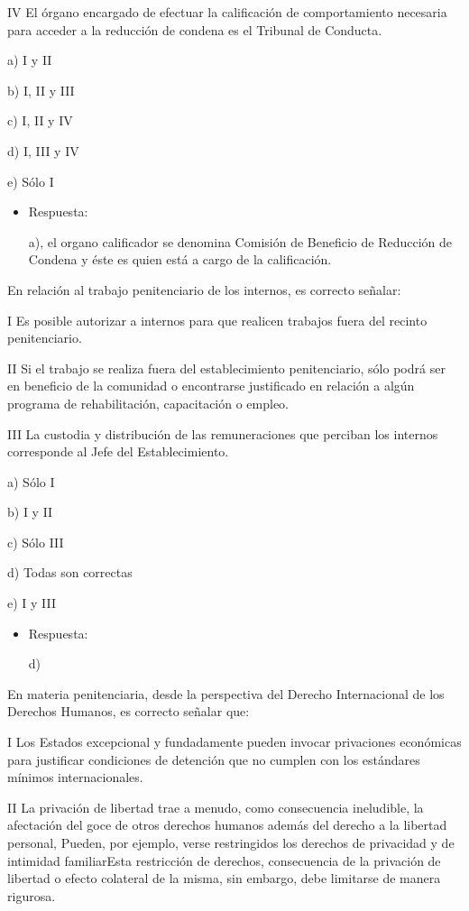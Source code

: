 \documentclass[letterpaper, 11pt]{article}
\begin{document}
IV El órgano encargado de efectuar la calificación de comportamiento
necesaria para acceder a la reducción de condena es el Tribunal de
Conducta.


a) I y II

b) I, II y III

c) I, II y IV

d) I, III y IV

e) Sólo I

\begin{itemize}
\item Respuesta:

a), el organo calificador se denomina Comisión de Beneficio de
Reducción de Condena y éste es quien está a cargo de la
calificación.
\end{itemize}


En relación al trabajo penitenciario de los internos, es correcto
señalar:

I Es posible autorizar a internos para que realicen trabajos fuera del
recinto penitenciario.

II Si el trabajo se realiza fuera del establecimiento penitenciario,
sólo podrá ser en beneficio de la comunidad o encontrarse justificado
en relación a algún programa de rehabilitación, capacitación o empleo.

III La custodia y distribución de las remuneraciones que perciban los
internos corresponde al Jefe del Establecimiento.


a) Sólo I

b) I y II

c) Sólo III

d) Todas son correctas

e) I y III

\begin{itemize}
\item Respuesta:

d)
\end{itemize}


En materia penitenciaria, desde la perspectiva del Derecho
Internacional de los Derechos Humanos, es correcto señalar que:

I Los Estados excepcional y fundadamente pueden invocar privaciones
económicas para justificar condiciones de detención que no cumplen con
los estándares mínimos internacionales.

II La privación de libertad trae a menudo, como consecuencia
ineludible, la afectación del goce de otros derechos humanos además
del derecho a la libertad personal, Pueden, por ejemplo, verse
restringidos los derechos de privacidad y de intimidad familiarEsta
restricción de derechos, consecuencia de la privación de libertad o
efecto colateral de la misma, sin embargo, debe limitarse de manera
rigurosa.
\end{document}

